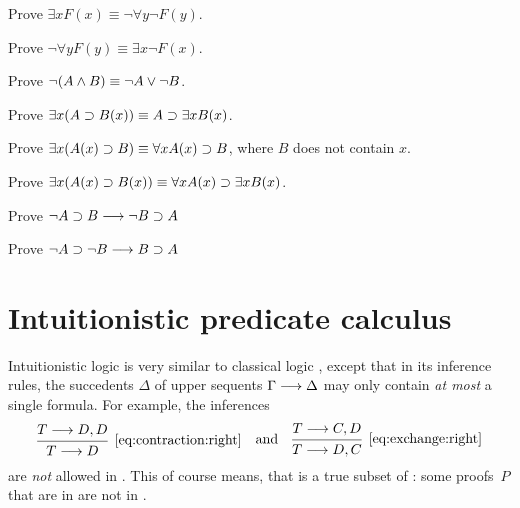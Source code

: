 \documentclass[11pt,a4paper]{article}
\begin{document}
\begin{exercise}[Exercise 2.5.3]\label{exe:2.5.3}
    Prove \(\exists x F(x) \equiv\lnot\forall y\lnot F(y)\).
\end{exercise}
\begin{exercise}[Exercise 2.5.4]\label{exe:2.5.4}
    Prove \(\lnot\forall yF(y) \equiv\exists x\lnot F(x)\).
\end{exercise}
\begin{exercise}[Exercise 2.5.5]\label{exe:2.5.5}
    Prove \(\lnot(A\land B) \equiv \lnot A\lor\lnot B\).
\end{exercise}
\begin{exercise}[Exercise 2.6.1]\label{exe:2.6.1}
    Prove \(\exists x(A\supset B(x))\equiv A\supset\exists xB(x)\).
\end{exercise}
\begin{exercise}[Exercise 2.6.2]\label{exe:2.6.2}
    Prove \(\exists x(A(x)\supset B)\equiv\forall xA(x)\supset B\),
    where \(B\) does not contain \(x\).
\end{exercise}
\begin{exercise}[Exercise 2.6.3]\label{exe:2.6.3}
    Prove \(\exists x(A(x)\supset B(x))\equiv\forall xA(x)\supset\exists xB(x)\).
\end{exercise}
\begin{exercise}[Exercise 2.6.4]\label{exe:2.6.4}
    Prove \(\lnot A\supset B\longrightarrow\lnot B\supset A\)
\end{exercise}
\begin{exercise}[Exercise 2.6.5]\label{exe:2.6.5}
    Prove \(\lnot A\supset\lnot B\longrightarrow B\supset A\)
\end{exercise}


\section{Intuitionistic predicate calculus \LJ}

Intuitionistic logic \LJ{} is very similar to classical logic \LK,
except that in its inference rules, the succedents \(\Delta\) of upper sequents \(\Gamma\longrightarrow\Delta\)
may only contain \emph{at most} a single formula. For example, the inferences
\begin{equation*}
    \begin{prooftree}
        \hypo{T\seq D, D}
        \infer1[\eqref{eq:contraction:right}]{T\seq D}
    \end{prooftree}
    \quad\text{and}\quad
    \begin{prooftree}
        \hypo{T\seq C, D}
        \infer1[\eqref{eq:exchange:right}]{T\seq D, C}
    \end{prooftree}
\end{equation*}
are \emph{not} allowed in \LJ{}. This of course means, that \LJ{} is a true subset of \LK:
some proofs~\(P\) that are in \LK{} are not in \LJ{}.
\end{document}
